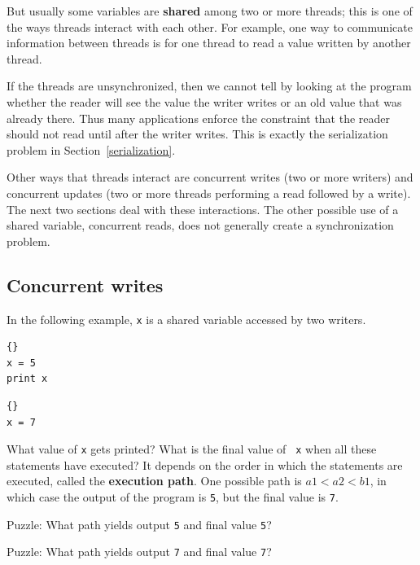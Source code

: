\documentclass{book}
\begin{document}
But usually some variables are {\bf shared} among two or more
threads; this is one of the ways threads interact with each other.
For example, one way to communicate information between threads is
for one thread to read a value written by another thread.

If the threads are unsynchronized, then we cannot tell by looking at
the program whether the reader will see the value the writer writes
or an old value that was already there.
Thus many applications enforce the constraint that the reader
should not read until after the writer writes.  This is exactly
the serialization problem in Section~\ref{serialization}.

Other ways that threads interact are
concurrent writes (two or more writers) and concurrent updates
(two or more threads performing a read followed by a write).
The next two sections deal with these interactions.  The other
possible use of a shared variable, concurrent
reads, does not generally create a synchronization problem.


\subsection {Concurrent writes}

In the following example, {\tt x} is a shared variable accessed
by two writers.

\begin{minipage}[t]{0.4\textwidth}
    \begin{lstlisting}[title={Thread A}]{}
x = 5
print x
\end{lstlisting}
\end{minipage}
\hfill
\begin{minipage}[t]{0.4\textwidth}
    \begin{lstlisting}[title={Thread B}]{}
x = 7
\end{lstlisting}
\end{minipage}

What value of {\tt x} gets printed?  What is the final value of {\tt
        x} when all these statements have executed?  It depends on the order
in which the statements are executed, called the {\bf execution path}.
One possible path is $a1 < a2 < b1$, in which case the output of the
program is {\tt 5}, but the final value is {\tt 7}.

Puzzle: What path yields output {\tt 5} and final
value {\tt 5}?

Puzzle: What path yields output {\tt 7} and final
value {\tt 7}?
\end{document}
